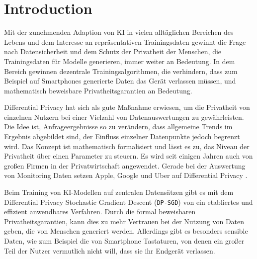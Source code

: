 \chapter{Introduction}

Mit der zunehmenden Adaption von KI in vielen alltäglichen Bereichen des Lebens und dem Interesse an repräsentativen Trainingsdaten gewinnt die Frage nach Datensicherheit und dem Schutz der Privatheit der Menschen, die Trainingsdaten für Modelle generieren, immer weiter an Bedeutung. In dem Bereich gewinnen dezentrale Trainingsalgorithmen, die verhindern, dass zum Beispiel auf Smartphones generierte Daten das Gerät verlassen müssen, und mathematisch beweisbare Privatheitsgarantien an Bedeutung.

Differential Privacy hat sich als gute Maßnahme erwiesen, um die Privatheit von einzelnen Nutzern bei einer Vielzahl von Datenauswertungen zu gewährleisten. Die Idee ist, Anfrageergebnisse so zu verändern, dass allgemeine Trends im Ergebnis abgebildet sind, der Einfluss einzelner Datenpunkte jedoch begrenzt wird. Das Konzept ist mathematisch formalisiert und lässt es zu, das Niveau der Privatheit über einen Parameter zu steuern. Es wird seit einigen Jahren auch von großen Firmen in der Privatwirtschaft angewendet. Gerade bei der Auswertung von Monitoring Daten setzen Apple, Google und Uber auf Differential Privacy \parencite{apple:2017, erlingsson:2014, tezapsidis:2017}. 

Beim Training von KI-Modellen auf zentralen Datensätzen gibt es mit dem Differential Privacy Stochastic Gradient Descent (\texttt{DP-SGD}) von \textcite{abadi:2016} ein etabliertes und effizient anwendbares Verfahren. Durch die formal beweisbaren Privatheitsgarantien, kann dies zu mehr Vertrauen bei der Nutzung von Daten geben, die von Menschen generiert werden. Allerdings gibt es besonders sensible Daten, wie zum Beispiel die von Smartphone Tastaturen, von denen ein großer Teil der Nutzer vermutlich nicht will, dass sie ihr Endgerät verlassen.

